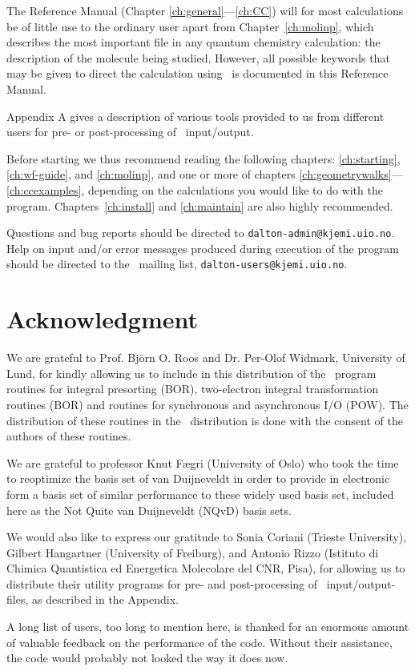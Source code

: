 \begin{description}
\item The Reference Manual (Chapter \ref{ch:general}---\ref{ch:CC})
will for most calculations be of 
little use to the ordinary user apart from Chapter~\ref{ch:molinp},
which describes
the most important file in any quantum chemistry calculation: the
description of the molecule being studied. However, all possible
keywords that may be given to direct the calculation using \dalton\ is
documented in this Reference Manual.

\item Appendix A gives a description of various tools provided to us
from different users for pre- or post-processing of \dalton\
input/output.
\end{description}

Before starting we thus recommend reading
the following chapters: \ref{ch:starting}, \ref{ch:wf-guide}, and
\ref{ch:molinp}, and one or more of chapters
\ref{ch:geometrywalks}---\ref{ch:ccexamples}, depending on the
calculations you would like to do with the
program. Chapters~\ref{ch:install} and \ref{ch:maintain} are also
highly recommended.

Questions and bug reports should be
directed to \verb|dalton-admin@kjemi.uio.no|. Help on input and/or
error messages produced during execution of the program should be
directed to the \dalton\ mailing list\index{mailing list},
\verb|dalton-users@kjemi.uio.no|.

\section{Acknowledgment}

We are grateful to Prof. Bj\"{o}rn O. Roos and Dr. Per-Olof
Widmark, University of Lund, for kindly allowing us to include in
this distribution of the \dalton\ program routines for integral
presorting (BOR), two-electron integral
transformation routines\index{integral transformation} (BOR) and
routines for synchronous and asynchronous I/O (POW). The
distribution of these routines in the \dalton\ distribution is
done with the consent of the authors of these routines.

We are grateful to professor Knut F\ae gri (University of Oslo) who
took the time to reoptimize the basis set of van Duijneveldt in order
to provide in electronic form a basis set of similar performance to
these widely used basis set, included here as the Not Quite van
Duijneveldt (NQvD) basis sets.

We would also like to express our gratitude to Sonia Coriani (Trieste
University), Gilbert Hangartner (University of Freiburg), and Antonio
Rizzo (Istituto di Chimica Quantistica ed Energetica Molecolare del
CNR, Pisa), for allowing us to distribute their utility programs for
pre- and post-processing of \dalton\ input/output-files, as described
in the Appendix.

A long list of users, too long to mention here, is thanked for an
enormous amount of valuable feedback on the performance of the
code. Without their assistance, the code would probably not looked the
way it does now.
